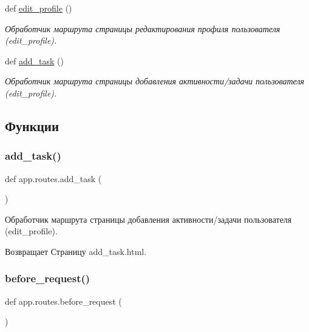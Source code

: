 \begin{DoxyCompactItemize}
def \mbox{\hyperlink{namespaceapp_1_1routes_a47169dd03493dd1713ce2678b0bda4a7}{edit\+\_\+profile}} ()
\begin{DoxyCompactList}\small\item\em Обработчик маршрута страницы редактирования профиля пользователя (edit\+\_\+profile). \end{DoxyCompactList}\item 
def \mbox{\hyperlink{namespaceapp_1_1routes_acc68c844fc8a746aaaa67ce6a0084cab}{add\+\_\+task}} ()
\begin{DoxyCompactList}\small\item\em Обработчик маршрута страницы добавления активности/задачи пользователя (edit\+\_\+profile). \end{DoxyCompactList}\end{DoxyCompactItemize}


\subsection{Функции}
\mbox{\label{namespaceapp_1_1routes_acc68c844fc8a746aaaa67ce6a0084cab}} 
\subsubsection{\texorpdfstring{add\+\_\+task()}{add\_task()}}
{\footnotesize\ttfamily def app.\+routes.\+add\+\_\+task (\begin{DoxyParamCaption}{ }\end{DoxyParamCaption})}



Обработчик маршрута страницы добавления активности/задачи пользователя (edit\+\_\+profile). 

\begin{DoxyReturn}{Возвращает}
Страницу add\+\_\+task.\+html. 
\end{DoxyReturn}
\mbox{\label{namespaceapp_1_1routes_a8ba7eb4307e6ac0abf716627873cbade}} 
\subsubsection{\texorpdfstring{before\+\_\+request()}{before\_request()}}
{\footnotesize\ttfamily def app.\+routes.\+before\+\_\+request (\begin{DoxyParamCaption}{ }\end{DoxyParamCaption})}



